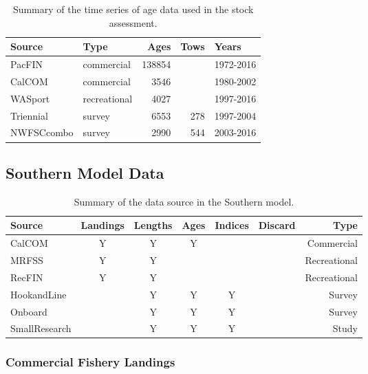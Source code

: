 \documentclass[12pt,]{article}
\begin{document}
\begin{table}[ht]
\centering
\caption{Summary of the
                                              time series of age data used in the stock
                                              assessment.} 
\label{tab:Age_sources}
\begin{tabular}{llrrl}
  \hline
Source & Type & Ages & Tows & Years \\ 
  \hline
PacFIN & commercial & 138854 &  & 1972-2016 \\ 
  CalCOM & commercial & 3546 &  & 1980-2002 \\ 
  WASport & recreational & 4027 &  & 1997-2016 \\ 
  Triennial & survey & 6553 & 278 & 1997-2004 \\ 
  NWFSCcombo & survey & 2990 & 544 & 2003-2016 \\ 
   \hline
\end{tabular}
\end{table}

\FloatBarrier
\newpage
\clearpage
\FloatBarrier

\subsection{Southern Model Data}\label{southern-model-data}

\vspace{.5cm}

\begin{table}[ht]
\centering
\caption{Summary of the data source in the Southern model.} 
\label{tab:Data_sources}
\begin{tabular}{lcccccr}
  \hline
Source & Landings & Lengths & Ages & Indices & Discard & Type \\ 
  \hline
CalCOM & Y & Y & Y &  &  & Commercial \\ 
  MRFSS & Y & Y &  &  &  & Recreational \\ 
  RecFIN & Y & Y &  &  &  & Recreational \\ 
  HookandLine &  & Y & Y & Y &  & Survey \\ 
  Onboard &  & Y & Y & Y &  & Survey \\ 
  SmallResearch &  & Y & Y & Y &  & Study \\ 
   \hline
\end{tabular}
\end{table}

\subsubsection{Commercial Fishery
Landings}\label{commercial-fishery-landings-1}
\end{document}
